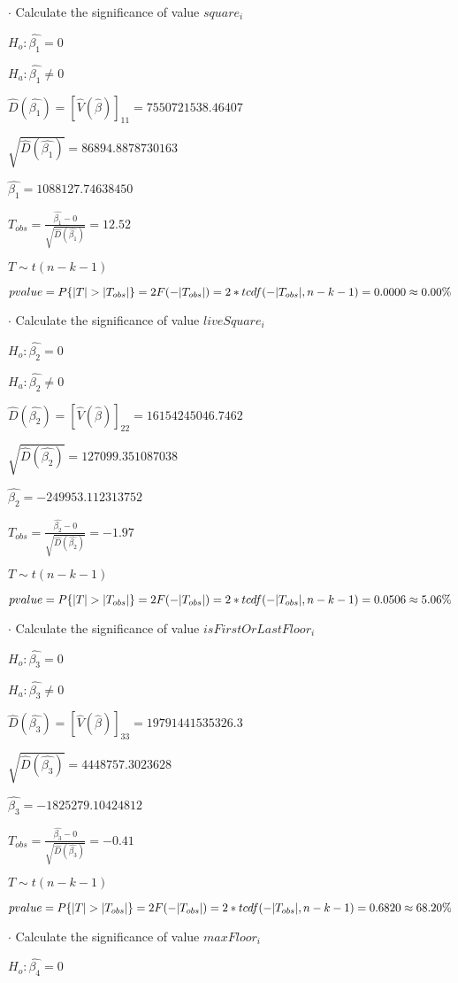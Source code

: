 \documentclass{article}
\begin{document}
$\cdot$ Calculate the significance of value $square_i$

$H_o: \hat{\beta_1}=0$

$H_a: \hat{\beta_1}\neq0$

$\hat{D}(\hat{\beta_1})=[\hat{V}(\hat{\beta})]_{1 1}=7550721538.46407$

$\sqrt{\hat{D}(\hat{\beta_1})}=86894.8878730163$

$\hat{\beta_1}=1088127.74638450$

$T_{obs}=\frac{\hat{\beta_1}-0}{\sqrt{\hat{D}(\hat{\beta_1})}}=12.52$

$T\sim t(n-k-1)$

$pvalue=P\{|T|>|T_{obs}|\}=2F(-|T_{obs}|)=2*tcdf(-|T_{obs}|, n-k-1)=0.0000\approx0.00\%\bigskip$

$\cdot$ Calculate the significance of value $liveSquare_i$

$H_o: \hat{\beta_2}=0$

$H_a: \hat{\beta_2}\neq0$

$\hat{D}(\hat{\beta_2})=[\hat{V}(\hat{\beta})]_{2 2}=16154245046.7462$

$\sqrt{\hat{D}(\hat{\beta_2})}=127099.351087038$

$\hat{\beta_2}=-249953.112313752$

$T_{obs}=\frac{\hat{\beta_2}-0}{\sqrt{\hat{D}(\hat{\beta_2})}}=-1.97$

$T\sim t(n-k-1)$

$pvalue=P\{|T|>|T_{obs}|\}=2F(-|T_{obs}|)=2*tcdf(-|T_{obs}|, n-k-1)=0.0506\approx5.06\%\bigskip$

$\cdot$ Calculate the significance of value $isFirstOrLastFloor_i$

$H_o: \hat{\beta_3}=0$

$H_a: \hat{\beta_3}\neq0$

$\hat{D}(\hat{\beta_3})=[\hat{V}(\hat{\beta})]_{3 3}=19791441535326.3$

$\sqrt{\hat{D}(\hat{\beta_3})}=4448757.3023628$

$\hat{\beta_3}=-1825279.10424812$

$T_{obs}=\frac{\hat{\beta_3}-0}{\sqrt{\hat{D}(\hat{\beta_3})}}=-0.41$

$T\sim t(n-k-1)$

$pvalue=P\{|T|>|T_{obs}|\}=2F(-|T_{obs}|)=2*tcdf(-|T_{obs}|, n-k-1)=0.6820\approx68.20\%\bigskip$

$\cdot$ Calculate the significance of value $maxFloor_i$

$H_o: \hat{\beta_4}=0$
\end{document}
